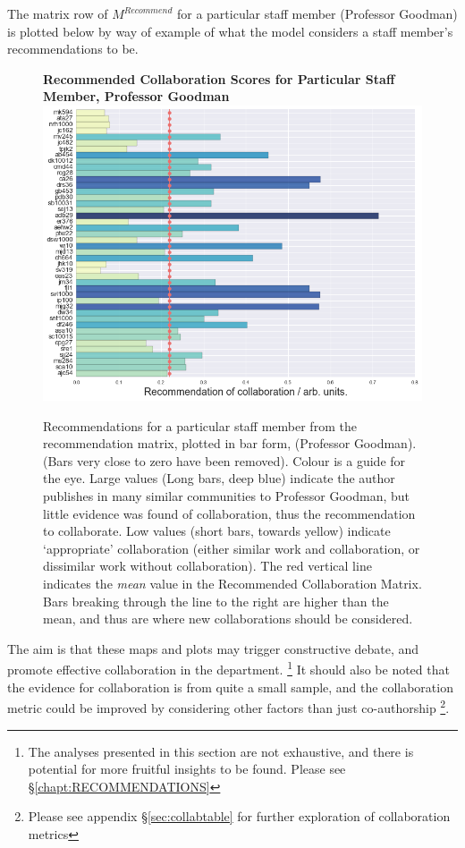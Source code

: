 The matrix row of $M^{Recommend}$ for a particular staff member (Professor Goodman) is plotted below by way of example of what the model considers a staff member's recommendations to be.
\begin{center}
\begin{figure}[H]
  \centering
  \textbf{Recommended Collaboration Scores for Particular Staff Member, Professor Goodman}
    \includegraphics[width=\textwidth]{Analysis/jmg_dots_line.png}
    \caption[Recommended Collaboration Scores for Particular Staff Member]{Recommendations for a particular staff member from the recommendation matrix, plotted in bar form, (Professor Goodman). (Bars very close to zero have been removed). Colour is a guide for the eye. Large values (Long bars, deep blue) indicate the author publishes in many similar communities to Professor Goodman, but little evidence was found of collaboration, thus the recommendation to collaborate. Low values (short bars, towards yellow) indicate `appropriate' collaboration (either similar work and collaboration, or dissimilar work without collaboration). The red vertical line indicates the \emph{mean} value in the Recommended Collaboration Matrix. Bars breaking through the line to the right are higher than the mean, and thus are where new collaborations should be considered.}
    \label{fig:RECOMM_BAR}
\end{figure} 
\end{center}
The aim is that these maps and plots may trigger constructive debate, and promote effective collaboration in the department. \footnote{The analyses presented in this section are not exhaustive, and there is potential for more fruitful insights to be found. Please see \S\ref{chapt:RECOMMENDATIONS}} It should also be noted that the evidence for collaboration is from quite a small sample, and the collaboration metric could be improved by considering other factors than just co-authorship \footnote{Please see appendix \S\ref{sec:collabtable} for further exploration of collaboration metrics}.

